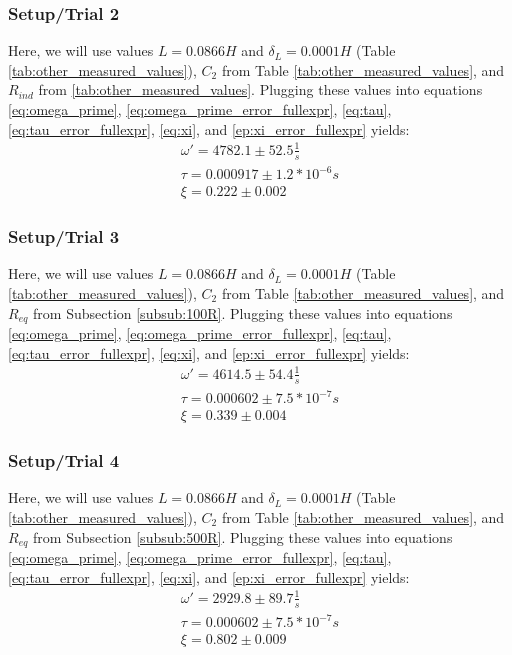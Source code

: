 \documentclass[12pt]{article}
\begin{document}
\subsubsection{Setup/Trial 2}
Here, we will use values $L=0.0866H$ and $\delta_L=0.0001H$ (Table \ref{tab:other_measured_values}), $C_2$ from Table \ref{tab:other_measured_values}, and $R_{ind}$ from \ref{tab:other_measured_values}. Plugging these values into equations \ref{eq:omega_prime}, \ref{eq:omega_prime_error_fullexpr}, \ref{eq:tau}, \ref{eq:tau_error_fullexpr}, \ref{eq:xi}, and \ref{ep:xi_error_fullexpr} yields:
\begin{align}
	\omega'=4782.1\pm52.5\frac{1}{s} \label{num:omega_prime_trial_two} \\
	\tau=0.000917\pm1.2*10^{-6} s \label{num:tau_trial_two} \\
	\xi=0.222\pm0.002 \label{num:xi_trial_two}
\end{align}

\subsubsection{Setup/Trial 3}
Here, we will use values $L=0.0866H$ and $\delta_L=0.0001H$ (Table \ref{tab:other_measured_values}), $C_2$ from Table \ref{tab:other_measured_values}, and $R_{eq}$ from Subsection \ref{subsub:100R}. Plugging these values into equations \ref{eq:omega_prime}, \ref{eq:omega_prime_error_fullexpr}, \ref{eq:tau}, \ref{eq:tau_error_fullexpr}, \ref{eq:xi}, and \ref{ep:xi_error_fullexpr} yields:
\begin{align}
	\omega'=4614.5\pm54.4\frac{1}{s} \label{num:omega_prime_trial_three} \\
	\tau=0.000602\pm7.5*10^{-7} s \label{num:tau_trial_three} \\
	\xi=0.339\pm0.004 \label{num:xi_trial_three}
\end{align}

\subsubsection{Setup/Trial 4}
Here, we will use values $L=0.0866H$ and $\delta_L=0.0001H$ (Table \ref{tab:other_measured_values}), $C_2$ from Table \ref{tab:other_measured_values}, and $R_{eq}$ from Subsection \ref{subsub:500R}. Plugging these values into equations \ref{eq:omega_prime}, \ref{eq:omega_prime_error_fullexpr}, \ref{eq:tau}, \ref{eq:tau_error_fullexpr}, \ref{eq:xi}, and \ref{ep:xi_error_fullexpr} yields:
\begin{align}
	\omega'=2929.8\pm89.7\frac{1}{s} \label{num:omega_prime_trial_four} \\
	\tau=0.000602\pm7.5*10^{-7} s \label{num:tau_trial_four} \\
	\xi=0.802\pm0.009 \label{num:xi_trial_four}
\end{align}
\end{document}
